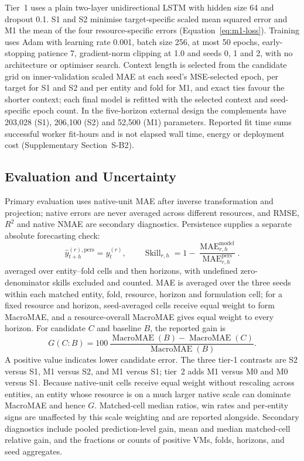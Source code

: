 \documentclass[5p,twocolumn]{elsarticle}
\begin{document}
Tier~1 uses a plain two-layer unidirectional LSTM \citep{Hochreiter1997LSTM}
with hidden size 64 and dropout 0.1. S1 and S2 minimise target-specific scaled
mean squared error and M1 the mean of the four resource-specific errors
(Equation~\ref{eq:m1-loss}). Training uses Adam with learning rate 0.001,
batch size 256, at most 50 epochs, early-stopping patience 7, gradient-norm
clipping at 1.0 and seeds 0, 1 and 2, with no architecture or optimiser
search. Context length is selected from the candidate grid on
inner-validation scaled MAE at each seed's MSE-selected epoch, per target for
S1 and S2 and per entity and fold for M1, and exact ties favour the shorter
context; each final model is refitted with the selected context and
seed-specific epoch count. In the five-horizon external design the
complements have 203,028 (S1), 206,100 (S2) and 52,500 (M1) parameters.
Reported fit time sums successful worker fit-hours and is not elapsed wall
time, energy or deployment cost (Supplementary Section~S-B2).

\subsection{Evaluation and Uncertainty}
\label{sec:evaluation}

Primary evaluation uses native-unit MAE after inverse transformation and
projection; native errors are never averaged across different resources, and
RMSE, $R^2$ and native NMAE are secondary diagnostics. Persistence supplies a
separate absolute forecasting check:
\begin{equation}
  \widehat{y}_{t+h}^{(r),\mathrm{pers}}=y_t^{(r)},
  \qquad
  \operatorname{Skill}_{r,h}
  =1-\frac{\operatorname{MAE}_{r,h}^{\mathrm{model}}}
           {\operatorname{MAE}_{r,h}^{\mathrm{pers}}}.
  \label{eq:persistence-skill}
\end{equation}
averaged over entity--fold cells and then horizons, with undefined
zero-denominator skills excluded and counted. MAE is averaged over the three
seeds within each matched entity, fold, resource, horizon and formulation
cell; for a fixed resource and horizon, seed-averaged cells receive equal
weight to form MacroMAE, and a resource-overall MacroMAE gives equal weight to
every horizon. For candidate $C$ and baseline $B$, the reported gain is
\begin{equation}
  G(C\!:\!B)=100\,
  \frac{\operatorname{MacroMAE}(B)-\operatorname{MacroMAE}(C)}
       {\operatorname{MacroMAE}(B)}.
  \label{eq:macro-gain}
\end{equation}
A positive value indicates lower candidate error.  The three tier-1
contrasts are S2 versus S1, M1 versus S2, and M1 versus S1; tier~2 adds M1
versus M0 and M0 versus S1. Because native-unit cells receive equal weight
without rescaling across entities, an entity whose resource is on a much
larger native scale can dominate MacroMAE and hence $G$. Matched-cell median
ratios, win rates and per-entity signs are unaffected by this scale
weighting and are reported alongside.  Secondary diagnostics include
pooled prediction-level gain, mean and median matched-cell relative gain, and
the fractions or counts of positive VMs, folds, horizons, and seed aggregates.
\end{document}
